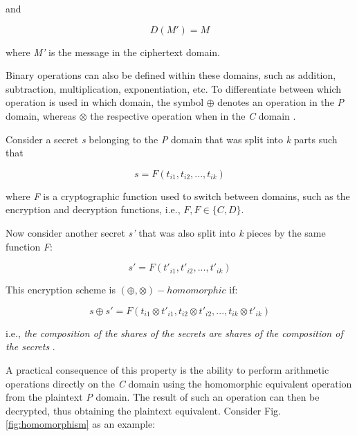 \documentclass[../access.tex]{subfiles}
\begin{document}
                and
                
                \begin{equation}
                    D(M') = M 
                \end{equation}
                
                where \textit{M'} is the message in the ciphertext domain.
                \par
                Binary operations can also be defined within these domains, such as addition, subtraction, multiplication, exponentiation, etc. To differentiate between which operation is used in which domain, the symbol $ \oplus $ denotes an operation in the \textit{P} domain, whereas $ \otimes $ the respective operation when in the \textit{C} domain \cite{Benaloh1986b} \cite{Rjaskova2002}.
                \par
                Consider a secret \textit{s} belonging to the \textit{P} domain that was split into \textit{k} parts such that 

                \begin{equation}
                    s = F(t_{i1}, t_{i2}, ..., t_{ik})
                \end{equation}
                
                where \textit{F} is a cryptographic function used to switch between domains, such as the encryption and decryption functions, i.e., $ F, F \in \{C, D\} $.
                \par
                Now consider another secret \textit{s'} that was also split into \textit{k} pieces by the same function \textit{F}: 
                
                \begin{equation}
                    s' = F(t'_{i1}, t'_{i2}, ..., t'_{ik})
                \end{equation}
                
                This encryption scheme is $ (\oplus, \otimes) - homomorphic $ if:
                
                \begin{equation}
                    s \oplus s' = F(t_{i1} \otimes t'_{i1}, t_{i2} \otimes t'_{i2}, ..., t_{ik} \otimes t'_{ik}) 
                \end{equation}
                
                i.e., \textit{the composition of the shares of the secrets are shares of the composition of the secrets} \cite{Benaloh1987}.
                \par
                A practical consequence of this property is the ability to perform arithmetic operations directly on the \textit{C} domain using the homomorphic equivalent operation from the plaintext \textit{P} domain. The result of such an operation can then be decrypted, thus obtaining the plaintext equivalent.
                Consider Fig. \ref{fig:homomorphism} as an example:
\end{document}
